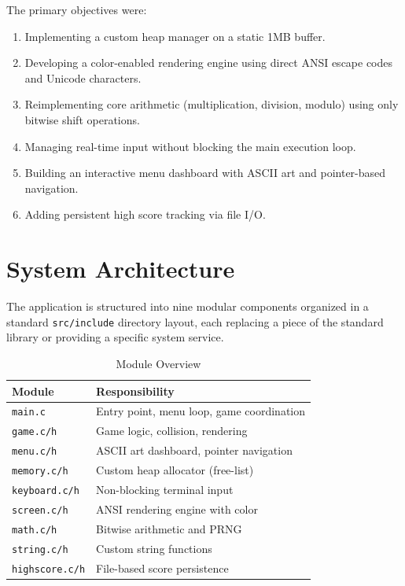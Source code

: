 \documentclass[conference]{IEEEtran}
\begin{document}
The primary objectives were:
\begin{enumerate}
\item Implementing a custom heap manager on a static 1MB buffer.
\item Developing a color-enabled rendering engine using direct ANSI escape codes and Unicode characters.
\item Reimplementing core arithmetic (multiplication, division, modulo) using only bitwise shift operations.
\item Managing real-time input without blocking the main execution loop.
\item Building an interactive menu dashboard with ASCII art and pointer-based navigation.
\item Adding persistent high score tracking via file I/O.
\end{enumerate}

\section{System Architecture}
The application is structured into nine modular components organized in a standard \texttt{src/include} directory layout, each replacing a piece of the standard library or providing a specific system service.

\begin{table}[h]
\centering
\caption{Module Overview}
\begin{tabular}{|l|l|}
\hline
\textbf{Module} & \textbf{Responsibility} \\
\hline
\texttt{main.c} & Entry point, menu loop, game coordination \\
\texttt{game.c/h} & Game logic, collision, rendering \\
\texttt{menu.c/h} & ASCII art dashboard, pointer navigation \\
\texttt{memory.c/h} & Custom heap allocator (free-list) \\
\texttt{keyboard.c/h} & Non-blocking terminal input \\
\texttt{screen.c/h} & ANSI rendering engine with color \\
\texttt{math.c/h} & Bitwise arithmetic and PRNG \\
\texttt{string.c/h} & Custom string functions \\
\texttt{highscore.c/h} & File-based score persistence \\
\hline
\end{tabular}
\end{table}
\end{document}
